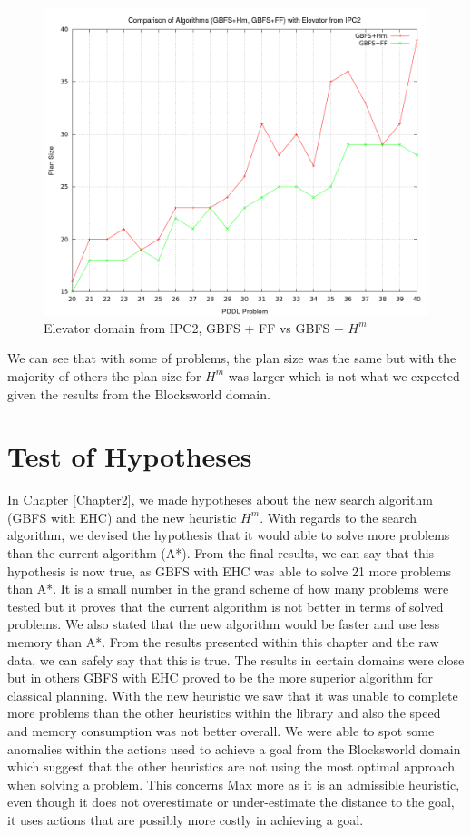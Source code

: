 \begin{figure}[!htb]
    \centering
    \includegraphics[scale=0.35]{Elevator20to40PlanSize.png}
    \caption{Elevator domain from IPC2, GBFS + FF vs GBFS + $H^m$ }
    \label{fig:ElevatorDomainGBFSwithHm}
\end{figure}
We can see that with some of problems, the plan size was the same but with the majority of others the plan size for $H^m$ was larger which is not what we expected given the results from the Blocksworld domain. 
\section{Test of Hypotheses}
In Chapter \ref{Chapter2}, we made hypotheses about the new search algorithm (GBFS with EHC) and the new heuristic $H^m$. With regards to the search algorithm, we devised the hypothesis that it would able to solve more problems than the current algorithm (A*). From the final results, we can say that this hypothesis is now true, as GBFS with EHC was able to solve 21 more problems than A*. It is a small number in the grand scheme of how many problems were tested but it proves that the current algorithm is not better in terms of solved problems. 
We also stated that the new algorithm would be faster and use less memory than A*. From the results presented within this chapter and the raw data, we can safely say that this is true. The results in certain domains were close but in others GBFS with EHC proved to be the more superior algorithm for classical planning.
With the new heuristic we saw that it was unable to complete more problems than the other heuristics within the library and also the speed and memory consumption was not better overall. We were able to spot some anomalies within the actions used to achieve a goal from the Blocksworld domain which suggest that the other heuristics are not using the most optimal approach when solving a problem. This concerns Max more as it is an admissible heuristic, even though it does not overestimate or under-estimate the distance to the goal, it uses actions that are possibly more costly in achieving a goal. 
